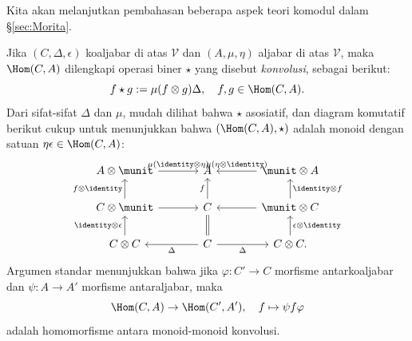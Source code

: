Kita akan melanjutkan pembahasan beberapa aspek teori komodul dalam
\S\ref{sec:Morita}.

\begin{remark}\label{rem:coalgebra-convolution}
	Jika $(C,\Delta,\epsilon)$ koaljabar di atas $\mathcal{V}$ dan
	$(A,\mu,\eta)$ aljabar di atas $\mathcal{V}$, maka $\Hom(C,A)$ dilengkapi
	operasi biner $\star$ yang disebut \emph{konvolusi}, sebagai berikut:
	\[ f \star g := \mu (f \otimes g) \Delta, \quad f, g \in \Hom(C, A). \]
	Dari sifat-sifat $\Delta$ dan $\mu$, mudah dilihat bahwa $\star$ asosiatif,
	dan diagram komutatif berikut cukup untuk menunjukkan bahwa
	$(\Hom(C,A),\star)$ adalah monoid dengan satuan
	$\eta\epsilon\in\Hom(C,A)$:
	\[\begin{tikzcd}[column sep=large]
		A \otimes \munit \arrow[r, "{\mu(\identity \otimes \eta)}"] & A & \munit \otimes A \arrow[l, "{\mu(\eta \otimes \identity)}"'] \\
		C \otimes \munit \arrow[r] \arrow[u, "{f \otimes \identity}"] & C \arrow[u, "f"] & \munit \otimes C \arrow[l] \arrow[u, "{\identity \otimes f}"'] \\
		C \otimes C \arrow[u, "{\identity \otimes \epsilon}"] & C \arrow[l, "\Delta"] \arrow[r, "\Delta"'] \arrow[equal, u] & C \otimes C . \arrow[u, "{\epsilon \otimes \identity}"']
	\end{tikzcd}\]
	Argumen standar menunjukkan bahwa jika $\varphi:C'\to C$ morfisme
	antarkoaljabar dan $\psi:A\to A'$ morfisme antaraljabar, maka
	\begin{equation}\label{eqn:convolution-functorial}
		\Hom(C, A) \to \Hom(C', A'), \quad f \mapsto \psi f \varphi
	\end{equation}
	adalah homomorfisme antara monoid-monoid konvolusi.
\end{remark}

